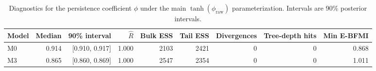\begin{table}[H]
\centering
\caption{{Diagnostics for the persistence coefficient $\phi$ under the main $\tanh(\phi_{\mathrm{raw}})$ parameterization. Intervals are 90\% posterior intervals.}\label{tab:s7-phi-diagnostics}}
\scriptsize
\begin{tabular}{lrrrrrrrr}
\toprule
Model & Median & 90\% interval & $\widehat R$ & Bulk ESS & Tail ESS & Divergences & Tree-depth hits & Min E-BFMI\\
\midrule
M0 & 0.914 & [0.910, 0.917] & 1.000 & 2103 & 2421 & 0 & 0 & 0.868\\
M3 & 0.865 & [0.860, 0.869] & 1.000 & 2547 & 2354 & 0 & 0 & 1.011\\
\bottomrule
\end{tabular}
\end{table}
